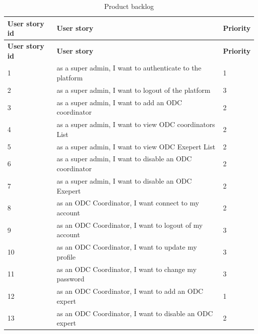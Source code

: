 \begin{longtable}{|l|l|l|}
      \caption{Product backlog}                                                                             \\    %
      \hline
      \textbf{User story id} & \textbf{User story}                                      & \textbf{Priority} \\ \hline
      \endfirsthead
      \hline
      \textbf{User story id} & \textbf{User story}                                      & \textbf{Priority} \\ \hline
      \endhead
      \endlastfoot
      1                      & as a super admin, I want to authenticate to the platform & 1                 \\ \hline
      2                      & as a super admin, I want to logout of the platform       & 3                 \\ \hline
      3                      & as a super admin, I want to add an ODC coordinator       & 2                 \\ \hline
      4                      & as a super admin, I want to view ODC coordinators List       & 2                 \\ \hline
      5                      & as a super admin, I want to view  ODC Exepert List       & 2                 \\ \hline
      6                      & as a super admin, I want to disable an ODC coordinator   & 2                 \\ \hline
      7                      & as a super admin, I want to disable an ODC Exepert       & 2                 \\ \hline
      8                      & as an ODC Coordinator, I want connect to my account      & 2                 \\ \hline
      9                      & as an ODC Coordinator, I want to logout of my account    & 3                 \\ \hline
      10                      & as an ODC Coordinator, I want to update my profile       & 3                 \\ \hline
      11                      & as an ODC Coordinator, I want to change my password      & 3                 \\ \hline
      12                      & as an ODC Coordinator, I want to add an ODC expert       & 1                 \\ \hline
      13                     & as an ODC Coordinator, I want to disable an ODC expert   & 2                 \\ \hline

\end{longtable}
